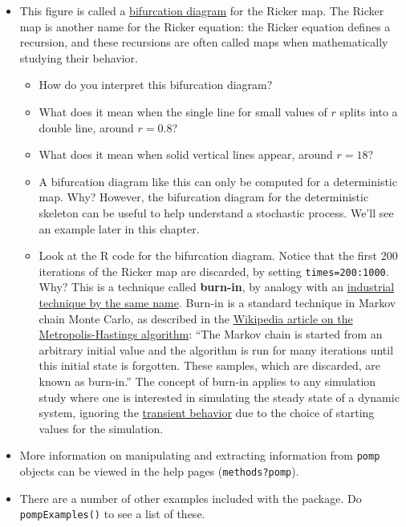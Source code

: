 \documentclass[]{article}
\begin{document}
\begin{itemize}
\item
  This figure is called a
  \href{https://en.wikipedia.org/wiki/Bifurcation_diagram}{bifurcation
  diagram} for the Ricker map. The Ricker map is another name for the
  Ricker equation: the Ricker equation defines a recursion, and these
  recursions are often called maps when mathematically studying their
  behavior.

  \begin{itemize}
  \item
    How do you interpret this bifurcation diagram?
  \item
    What does it mean when the single line for small values of \(r\)
    splits into a double line, around \(r=0.8\)?
  \item
    What does it mean when solid vertical lines appear, around \(r=18\)?
  \item
    A bifurcation diagram like this can only be computed for a
    deterministic map. Why? However, the bifurcation diagram for the
    deterministic skeleton can be useful to help understand a stochastic
    process. We'll see an example later in this chapter.
  \item
    Look at the R code for the bifurcation diagram. Notice that the
    first 200 iterations of the Ricker map are discarded, by setting
    \texttt{times=200:1000}. Why? This is a technique called
    \textbf{burn-in}, by analogy with an
    \href{https://en.wikipedia.org/wiki/Burn-in}{industrial technique by
    the same name}. Burn-in is a standard technique in Markov chain
    Monte Carlo, as described in the
    \href{https://en.wikipedia.org/wiki/Metropolis\%E2\%80\%93Hastings_algorithm}{Wikipedia
    article on the Metropolis-Hastings algorithm}: ``The Markov chain is
    started from an arbitrary initial value and the algorithm is run for
    many iterations until this initial state is forgotten. These
    samples, which are discarded, are known as burn-in.'' The concept of
    burn-in applies to any simulation study where one is interested in
    simulating the steady state of a dynamic system, ignoring the
    \href{https://en.wikipedia.org/wiki/Transient_response}{transient
    behavior} due to the choice of starting values for the simulation.
  \end{itemize}
\item
  More information on manipulating and extracting information from
  \texttt{pomp} objects can be viewed in the help pages
  (\texttt{methods?pomp}).
\item
  There are a number of other examples included with the package. Do
  \texttt{pompExamples()} to see a list of these.
\end{itemize}
\end{document}
